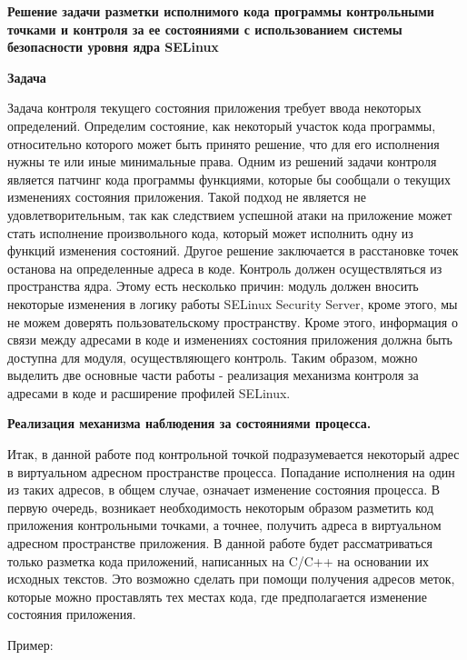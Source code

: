 
{\bfseries Решение задачи разметки исполнимого кода программы контрольными точками и контроля за ее состояниями с использованием системы безопасности уровня ядра SELinux}

\bigskip 
{\bfseries Задача} 

Задача контроля текущего состояния приложения требует ввода некоторых определений. Определим состояние, как некоторый участок кода программы, относительно которого может быть принято решение, что для его исполнения нужны те или иные минимальные права. Одним из решений задачи контроля является патчинг кода программы функциями, которые бы сообщали о текущих изменениях состояния приложения. Такой подход не является не удовлетворительным, так как следствием успешной атаки на приложение может стать исполнение произвольного кода, который может исполнить одну из функций изменения состояний. Другое решение заключается в расстановке точек останова на определенные адреса в коде. Контроль должен осуществляться из пространства ядра. Этому есть несколько причин: модуль должен вносить некоторые изменения в логику работы SELinux Security Server, кроме этого, мы не можем доверять пользовательскому пространству. Кроме этого, информация о связи между адресами в коде и изменениях состояния приложения должна быть доступна для модуля, осуществляющего контроль. Таким образом, можно выделить две основные части работы - реализация механизма контроля за адресами в коде и расширение профилей SELinux.

\bigskip 
{\bfseries Реализация механизма наблюдения за состояниями процесса.}

Итак, в данной работе под контрольной точкой подразумевается некоторый адрес в виртуальном адресном пространстве процесса. Попадание исполнения на один из таких адресов, в общем случае, означает изменение состояния процесса. В первую очередь, возникает необходимость некоторым образом разметить код приложения контрольными точками, а точнее, получить адреса в виртуальном адресном пространстве приложения. В данной работе будет рассматриваться только разметка кода приложений, написанных на C/C++ на основании их исходных текстов. Это возможно сделать при помощи получения адресов меток, которые можно проставлять тех местах кода, где предполагается изменение состояния приложения. 

Пример: 

